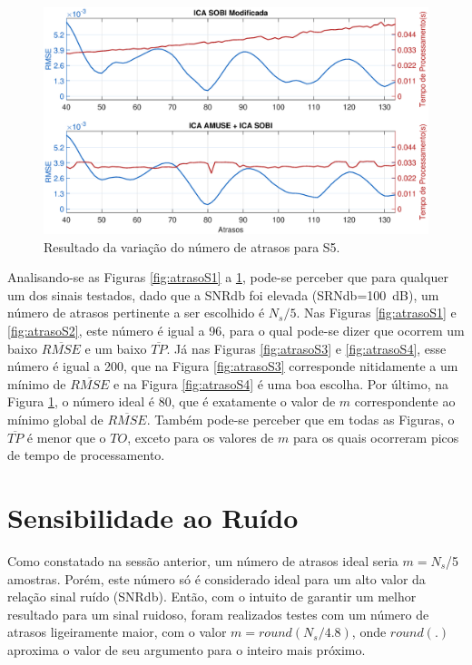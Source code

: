 \documentclass[a4paper,12pt]{monografia}
\theoremstyle{plain}
\theoremstyle{definition}
\theoremstyle{remark}
\begin{document}
\begin{figure}[!htb]
    \begin{center}
    \advance\leftskip -1.5cm
    \includegraphics[scale=0.45]{imagens/Sinal5Atrasov2.eps}
    \caption{Resultado da variação do número de atrasos para S5.}
    \label{fig:atrasoS5}
    \end{center}
\end{figure}

Analisando-se as Figuras \ref{fig:atrasoS1} a \ref{fig:atrasoS5}, pode-se perceber que para qualquer um dos sinais testados, dado que a SNRdb foi elevada (SRNdb=100~dB), um número de atrasos pertinente a ser escolhido é $N_s/5$. Nas Figuras \ref{fig:atrasoS1} e \ref{fig:atrasoS2}, este número é igual a 96, para o qual pode-se dizer que ocorrem um baixo $\overline{RMSE}$ e um baixo $\overline{TP}$. Já nas Figuras \ref{fig:atrasoS3} e \ref{fig:atrasoS4}, esse número é igual a 200, que na Figura \ref{fig:atrasoS3} corresponde nitidamente a um mínimo de $\overline{RMSE}$ e na Figura \ref{fig:atrasoS4} é uma boa escolha. Por último, na Figura \ref{fig:atrasoS5}, o número ideal é 80, que é exatamente o valor de $m$ correspondente ao mínimo global de $\overline{RMSE}$. Também pode-se perceber que em todas as Figuras, o $\overline{TP}$ é menor que o $TO$, exceto para os valores de $m$ para os quais ocorreram picos de tempo de processamento.  

\section{Sensibilidade ao Ruído}
\label{ch:testeRU}

Como constatado na sessão anterior, um número de atrasos ideal seria $m=N_s$/5 amostras. Porém, este número só é considerado ideal para um alto valor da relação sinal ruído (SNRdb). Então, com o intuito de garantir um melhor resultado para um sinal ruidoso, foram realizados testes com um número de atrasos ligeiramente maior, com o valor $m=round(N_s/4.8)$, onde $round(.)$ aproxima o valor de seu argumento para o inteiro mais próximo.
\end{document}

